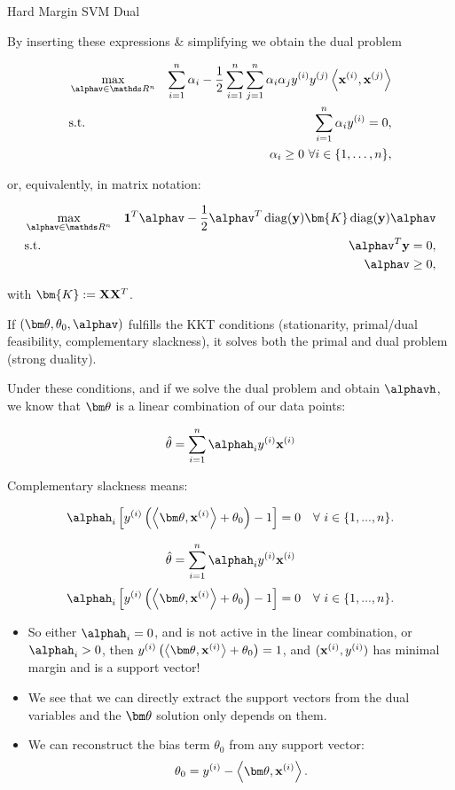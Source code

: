 \documentclass[11pt,compress,t,notes=noshow, xcolor=table]{beamer}
\begin{document}
\begin{vbframe}{Hard Margin SVM Dual}
\framebreak 

By inserting these expressions 
\& simplifying we obtain the dual problem

\vspace*{-0.5cm}
\begin{eqnarray*}
    & \max\limits_{\alphav \in \R^n} & \sum_{i=1}^n \alpha_i - \frac{1}{2}\sum_{i=1}^n\sum_{j=1}^n\alpha_i\alpha_j\yi y^{(j)} \scp{\xi}{\xv^{(j)}} \\
    & \text{s.t.} & \sum_{i=1}^n \alpha_i \yi = 0, \\
    & \quad & \alpha_i \ge 0~\forall i \in \nset,
\end{eqnarray*}

or, equivalently, in matrix notation:

\vspace*{-.5cm}
\begin{eqnarray*}
  & \max\limits_{\alphav \in \R^n} & \one^T \alphav - \frac{1}{2} \alphav^T \diag(\yv)\bm{K} \diag(\yv) \alphav \\
  & \text{s.t.} & \alphav^T \yv = 0, \\
  & \quad & \alphav \geq 0,
\end{eqnarray*}

with $\bm{K}:= \Xmat \Xmat^T$.

\framebreak

If $(\thetav, \theta_0, \alphav)$ fulfills the KKT conditions (stationarity, primal/dual feasibility, complementary slackness), it solves both the primal and dual problem (strong duality). 


Under these conditions, and if we solve the dual problem and obtain $\alphavh$, we know that $\thetav$ is a linear combination of our data points:
  
$$
   \thetah = \sumin \alphah_i \yi \xi 
$$

Complementary slackness means:

$$
\alphah_i \left[\yi  \left( \scp{\thetav}{\xi} + \theta_0 \right) - 1\right] = 0 \quad \forall ~ i \in \{1, ..., n \}.
$$

\framebreak

$$
   \thetah = \sumin \alphah_i \yi \xi 
$$
$$
\alphah_i \left[\yi  \left( \scp{\thetav}{\xi} + \theta_0 \right) - 1\right] = 0 \quad \forall ~ i \in \{1, ..., n \}.
$$

\begin{itemize}
  \item So either $\alphah_i = 0$, and is not active in the linear combination,
    or $\alphah_i > 0$, then $\yi \left( \scp{\thetav}{\xi} + \theta_0 \right) = 1$, and $(\mathbf{x}^{(i)}, y^{(i)})$ has minimal margin and is a support vector!
  \item We see that we can directly extract the support vectors from the dual variables and the $\thetav$ solution only depends on them.
  \item We can reconstruct the bias term $\theta_0$ from any support vector:
  $$
  \theta_0 = \yi - \scp{\thetav}{\xi}.
  $$
\end{itemize}


\end{vbframe}
\end{document}
